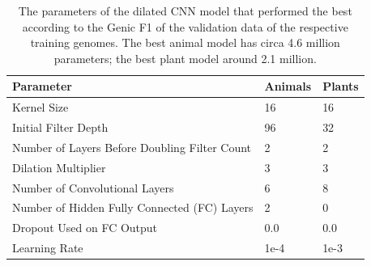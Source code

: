 \documentclass{article}
\begin{document}
\begin{table}[!h]
\renewcommand\thetable{S1}
\centering
\begin{tabular}{@{}lll@{}}
\hline
Parameter & Animals & Plants\\ [0.5ex]
\hline
Kernel Size & 16 & 16\\
Initial Filter Depth & 96 & 32\\
Number of Layers Before Doubling Filter Count & 2 & 2\\
Dilation Multiplier & 3 & 3\\
Number of Convolutional Layers & 6 & 8\\
Number of Hidden Fully Connected (FC) Layers & 2 & 0\\
Dropout Used on FC Output & 0.0 & 0.0\\
Learning Rate & 1e-4 & 1e-3\\
\hline
\end{tabular}
\caption{The parameters of the dilated CNN model that performed the best according to the Genic F1 of the validation data of the respective training genomes. The best animal model has circa 4.6 million parameters; the best plant model around 2.1 million.}
\end{table}



\renewcommand\refname{Supplemental Reference}


\end{document}
